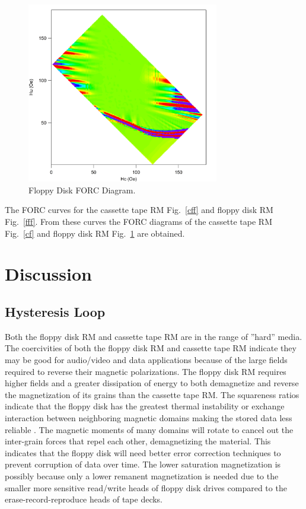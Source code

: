 \documentclass[aps,twocolumn,groupedaddress]{revtex4}
\begin{document}
\begin{figure}[h]
\includegraphics[width=3.3in]{floppyforc}
\caption{Floppy Disk FORC Diagram.}
\label{ff}
\end{figure}
The FORC curves for the cassette tape RM Fig.\ \ref{cff} and floppy disk RM Fig.\ \ref{fff}. From these curves the FORC diagrams of the cassette tape RM Fig.\ \ref{cf} and floppy disk RM Fig.\ \ref{ff} are obtained.


\section{Discussion}
\subsection{Hysteresis Loop}
Both the floppy disk RM and cassette tape RM are in the range of ''hard'' media. The coercivities of both the floppy disk RM and cassette tape RM indicate they may be good for audio/video and data applications because of the large fields required to reverse their magnetic polarizations. The floppy disk RM requires higher fields and a greater dissipation of energy to both demagnetize and reverse the magnetization of its grains than the cassette tape RM. The squareness ratios indicate that the floppy disk has the greatest thermal instability or exchange interaction between neighboring magnetic domains making the stored data less reliable \cite{NAKAGAWA}. The magnetic moments of many domains will rotate to cancel out the inter-grain forces that repel each other, demagnetizing the material. This indicates that the floppy disk will need better error correction techniques to prevent corruption of data over time. The lower saturation magnetization is possibly because only a lower remanent magnetization is needed due to the smaller more sensitive read/write heads of floppy disk drives compared to the erase-record-reproduce heads of tape decks. 
\end{document}

